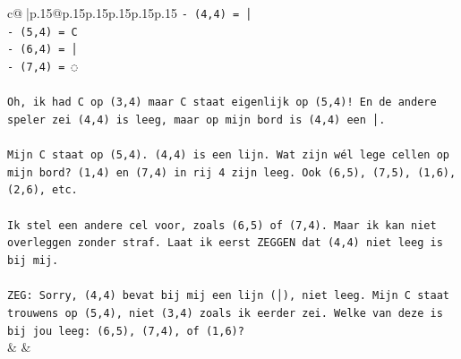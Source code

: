 \documentclass{article}
\begin{document}
{\begin{supertabular}{c@{$\;$}|p{.15\linewidth}@{}p{.15\linewidth}p{.15\linewidth}p{.15\linewidth}p{.15\linewidth}p{.15\linewidth}}
{{{\texttt{{-} (4,4) = │} \\
\texttt{{-} (5,4) = C} \\
\texttt{{-} (6,4) = │} \\
\texttt{{-} (7,4) = ◌} \\
\\ 
\texttt{Oh, ik had C op (3,4) maar C staat eigenlijk op (5,4)! En de andere speler zei (4,4) is leeg, maar op mijn bord is (4,4) een │.} \\
\\ 
\texttt{Mijn C staat op (5,4). (4,4) is een lijn. Wat zijn wél lege cellen op mijn bord? (1,4) en (7,4) in rij 4 zijn leeg. Ook (6,5), (7,5), (1,6), (2,6), etc.} \\
\\ 
\texttt{Ik stel een andere cel voor, zoals (6,5) of (7,4). Maar ik kan niet overleggen zonder straf. Laat ik eerst ZEGGEN dat (4,4) niet leeg is bij mij.} \\
\\ 
\texttt{ZEG: Sorry, (4,4) bevat bij mij een lijn (│), niet leeg. Mijn C staat trouwens op (5,4), niet (3,4) zoals ik eerder zei. Welke van deze is bij jou leeg: (6,5), (7,4), of (1,6)?} \\
            }
        }
    }
    & & \\ \\


\end{supertabular}}
\end{document}
